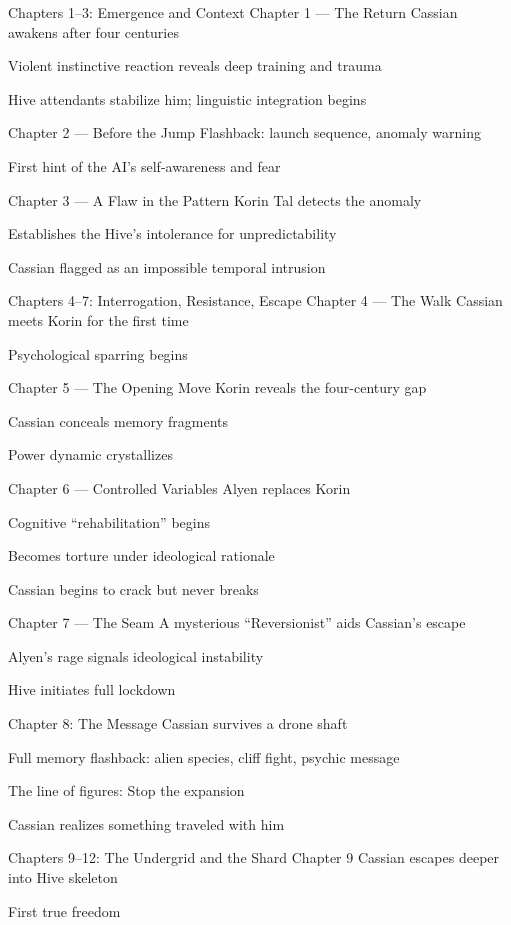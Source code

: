 \documentclass[12pt,oneside]{book}
\begin{document}
Chapters 1–3: Emergence and Context
Chapter 1 — The Return
Cassian awakens after four centuries


Violent instinctive reaction reveals deep training and trauma


Hive attendants stabilize him; linguistic integration begins


Chapter 2 — Before the Jump
Flashback: launch sequence, anomaly warning


First hint of the AI’s self-awareness and fear


Chapter 3 — A Flaw in the Pattern
Korin Tal detects the anomaly


Establishes the Hive’s intolerance for unpredictability


Cassian flagged as an impossible temporal intrusion



Chapters 4–7: Interrogation, Resistance, Escape
Chapter 4 — The Walk
Cassian meets Korin for the first time


Psychological sparring begins


Chapter 5 — The Opening Move
Korin reveals the four-century gap


Cassian conceals memory fragments


Power dynamic crystallizes


Chapter 6 — Controlled Variables
Alyen replaces Korin


Cognitive “rehabilitation” begins


Becomes torture under ideological rationale


Cassian begins to crack but never breaks


Chapter 7 — The Seam
A mysterious “Reversionist” aids Cassian’s escape


Alyen’s rage signals ideological instability


Hive initiates full lockdown



Chapter 8: The Message
Cassian survives a drone shaft


Full memory flashback: alien species, cliff fight, psychic message


The line of figures: Stop the expansion


Cassian realizes something traveled with him



Chapters 9–12: The Undergrid and the Shard
Chapter 9
Cassian escapes deeper into Hive skeleton


First true freedom
\end{document}
